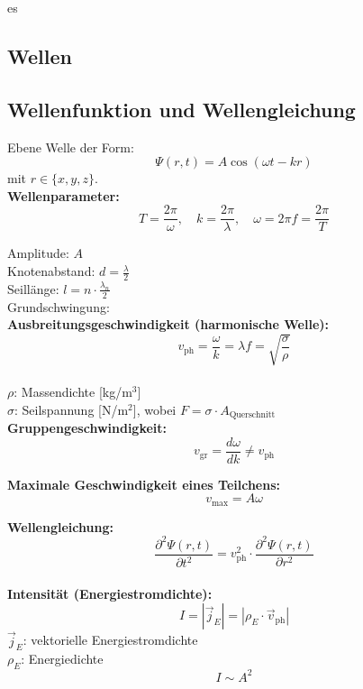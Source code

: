 es\documentclass[a4paper, fontsize=8pt, landscape]{scrartcl}
\begin{document}
\begin{multicols*}{4}
\columnbreak
\section{Wellen}

\subsection{Wellenfunktion und Wellengleichung}
Ebene Welle der Form:
\[
\Psi(r,t) = A \cos(\omega t - k r)
\]
mit \(r \in \{x,y,z\}\).\\

\textbf{Wellenparameter:}
\[
T = \frac{2\pi}{\omega}, \quad
k = \frac{2\pi}{\lambda}, \quad
\omega = 2\pi f = \frac{2\pi}{T}
\]

Amplitude: \(A\)\\
Knotenabstand: \(d = \frac{\lambda}{2}\)\\
Seillänge: \(l = n \cdot \frac{\lambda_n}{2}\)\\
Grundschwingung: \\

\textbf{Ausbreitungsgeschwindigkeit (harmonische Welle):}
\[
v_{\text{ph}} = \frac{\omega}{k} = \lambda f = \sqrt{\frac{\sigma}{\rho}}
\]\\
\(\rho\): Massendichte [kg/m\(^3\)]\\
\(\sigma\): Seilspannung [N/m\(^2\)], wobei \(F = \sigma \cdot A_{\text{Querschnitt}}\)\\

\textbf{Gruppengeschwindigkeit:}
\[
v_{\text{gr}} = \frac{d\omega}{dk} \neq v_{\text{ph}}
\]

\textbf{Maximale Geschwindigkeit eines Teilchens:}
\[
v_{\text{max}} = A \omega
\]

\textbf{Wellengleichung:}
\[
\frac{\partial^2 \Psi(r,t)}{\partial t^2} = v_{\text{ph}}^2 \cdot \frac{\partial^2 \Psi(r,t)}{\partial r^2}
\]\\

\textbf{Intensität (Energiestromdichte):}
\[
I = |\vec{j}_E| = |\rho_E \cdot \vec{v}_{\text{ph}}|
\]
\(\vec{j}_E\): vektorielle Energiestromdichte\\
\(\rho_E\): Energiedichte\\
\[
I \sim A^2
\]


\end{multicols*}
\end{document}
